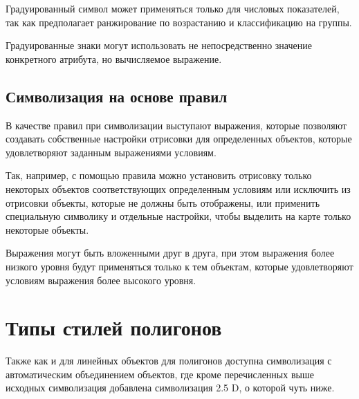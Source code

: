 \documentclass[
  russian,
  letterpaper,
  DIV=11,
  numbers=noendperiod]{scrartcl}
\begin{document}
Градуированный символ может применяться только для числовых показателей,
так как предполагает ранжирование по возрастанию и классификацию на
группы.

Градуированные знаки могут использовать не непосредственно значение
конкретного атрибута, но вычисляемое выражение.

\subsection{Символизация на основе
правил}\label{ux441ux438ux43cux432ux43eux43bux438ux437ux430ux446ux438ux44f-ux43dux430-ux43eux441ux43dux43eux432ux435-ux43fux440ux430ux432ux438ux43b}

В качестве правил при символизации выступают выражения, которые
позволяют создавать собственные настройки отрисовки для определенных
объектов, которые удовлетворяют заданным выражениями условиям.

Так, например, с помощью правила можно установить отрисовку только
некоторых объектов соответствующих определенным условиям или исключить
из отрисовки объекты, которые не должны быть отображены, или применить
специальную символику и отдельные настройки, чтобы выделить на карте
только некоторые объекты.

\begin{tcolorbox}[enhanced jigsaw, arc=.35mm, bottomrule=.15mm, bottomtitle=1mm, breakable, colback=white, colbacktitle=quarto-callout-tip-color!10!white, colframe=quarto-callout-tip-color-frame, coltitle=black, left=2mm, leftrule=.75mm, opacityback=0, opacitybacktitle=0.6, rightrule=.15mm, title=\textcolor{quarto-callout-tip-color}{\faLightbulb}\hspace{0.5em}{Дополнительно}, titlerule=0mm, toprule=.15mm, toptitle=1mm]

Выражения могут быть вложенными друг в друга, при этом выражения более
низкого уровня будут применяться только к тем объектам, которые
удовлетворяют условиям выражения более высокого уровня.

\end{tcolorbox}

\section{Типы стилей
полигонов}\label{ux442ux438ux43fux44b-ux441ux442ux438ux43bux435ux439-ux43fux43eux43bux438ux433ux43eux43dux43eux432}

Также как и для линейных объектов для полигонов доступна символизация с
автоматическим объединением объектов, где кроме перечисленных выше
исходных символизация добавлена символизация 2.5 D, о которой чуть ниже.
\end{document}
